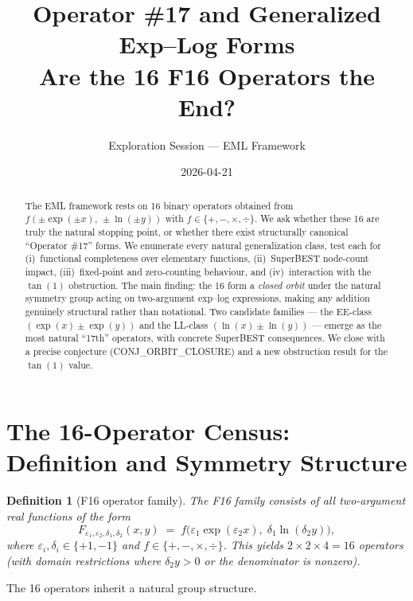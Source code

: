 \documentclass[11pt]{article}
\title{Operator \#17 and Generalized Exp--Log Forms\\
{\large Are the 16 F16 Operators the End?}}
\author{Exploration Session --- EML Framework}
\date{2026-04-21}
\newtheorem{definition}[theorem]{Definition}
\begin{document}
\maketitle

\begin{abstract}
The EML framework rests on 16 binary operators obtained from
$f(\pm\exp(\pm x),\, \pm\ln(\pm y))$ with $f \in \{+,-,\times,\div\}$.
We ask whether these 16 are truly the natural stopping point, or whether
there exist structurally canonical ``Operator \#17'' forms.
We enumerate every natural generalization class, test each for
(i)~functional completeness over elementary functions,
(ii)~SuperBEST node-count impact,
(iii)~fixed-point and zero-counting behaviour, and
(iv)~interaction with the $\tan(1)$ obstruction.
The main finding: the 16 form a \emph{closed orbit} under the natural
symmetry group acting on two-argument exp--log expressions, making any
addition genuinely structural rather than notational. Two candidate families
--- the EE-class $(\exp(x) \pm \exp(y))$ and the LL-class $(\ln(x) \pm \ln(y))$
--- emerge as the most natural ``17th'' operators, with concrete SuperBEST
consequences. We close with a precise conjecture (CONJ\_ORBIT\_CLOSURE) and
a new obstruction result for the $\tan(1)$ value.
\end{abstract}

\tableofcontents
\bigskip

\section{The 16-Operator Census: Definition and Symmetry Structure}
\label{sec:census}

\begin{definition}[F16 operator family]
The \emph{F16 family} consists of all two-argument real functions of the form
\[
  F_{\varepsilon_1,\varepsilon_2,\delta_1,\delta_2}(x,y)
  \;=\;
  f\!\bigl(\varepsilon_1\exp(\varepsilon_2 x),\; \delta_1\ln(\delta_2 y)\bigr),
\]
where $\varepsilon_i, \delta_i \in \{+1,-1\}$ and $f \in \{+,-,\times,\div\}$.
This yields $2 \times 2 \times 4 = 16$ operators (with domain restrictions where
$\delta_2 y > 0$ or the denominator is nonzero).
\end{definition}

\noindent The 16 operators inherit a natural group structure.
\end{document}
